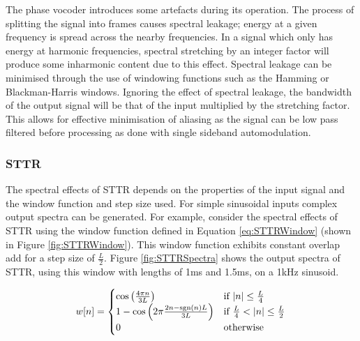 			The phase vocoder introduces some artefacts during its operation. The process of splitting the
			signal into frames causes spectral leakage; energy at a given frequency is spread across the nearby
			frequencies. In a signal which only has energy at harmonic frequencies, spectral stretching by an
			integer factor will produce some inharmonic content due to this effect. Spectral leakage can be
			minimised through the use of windowing functions such as the Hamming or Blackman-Harris windows.
			Ignoring the effect of spectral leakage, the bandwidth of the output signal will be that of the
			input multiplied by the stretching factor. This allows for effective minimisation of aliasing as the
			signal can be low pass filtered before processing as done with single sideband automodulation.
		
		\subsubsection*{STTR}
			The spectral effects of STTR depends on the properties of the input signal and the window function
			and step size used. For simple sinusoidal inputs complex output spectra can be generated. For
			example, consider the spectral effects of STTR using the window function defined in Equation
			\ref{eq:STTRWindow} (shown in Figure \ref{fig:STTRWindow}). This window function exhibits constant
			overlap add for a step size of $\frac{L}{2}$. Figure \ref{fig:STTRSpectra} shows the output spectra
			of STTR, using this window with lengths of 1ms and 1.5ms, on a 1kHz sinusoid.

			\begin{equation}
				w[n] = \begin{cases}
					\cos \left( \frac{4\pi n}{3L} \right) & \text{if $\left|n\right| \leq \frac{L}{4} $} \\
					1 - \cos \left( 2\pi \frac{2n - \operatorname{sgn}(n)L}{3L} \right) &
						\text{if $\frac{L}{4} < \left|n\right| \leq \frac{L}{2}$} \\
					0 & \text{otherwise}
				\end{cases}
				\label{eq:STTRWindow}
			\end{equation}

